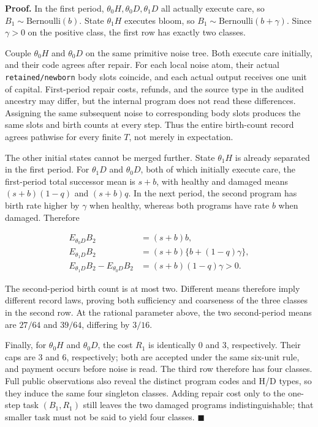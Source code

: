 \documentclass[
  english,
  11pt,
  oneside]{book}
\begin{document}
\textbf{Proof.} In the first period, \(\theta_0H,\theta_0D,\theta_1D\) all actually execute care, so \(B_1\sim\mathrm{Bernoulli}(b)\). State \(\theta_1H\) executes bloom, so \(B_1\sim\mathrm{Bernoulli}(b+\gamma)\). Since \(\gamma>0\) on the positive class, the first row has exactly two classes.

Couple \(\theta_0H\) and \(\theta_0D\) on the same primitive noise tree. Both execute care initially, and their code agrees after repair. For each local noise atom, their actual \nolinkurl{retained/newborn} body slots coincide, and each actual output receives one unit of capital. First-period repair costs, refunds, and the source type in the audited ancestry may differ, but the internal program does not read these differences. Assigning the same subsequent noise to corresponding body slots produces the same slots and birth counts at every step. Thus the entire birth-count record agrees pathwise for every finite \(T\), not merely in expectation.

The other initial states cannot be merged further. State \(\theta_1H\) is already separated in the first period. For \(\theta_1D\) and \(\theta_0D\), both of which initially execute care, the first-period total successor mean is \(s+b\), with healthy and damaged means \((s+b)(1-q)\) and \((s+b)q\). In the next period, the second program has birth rate higher by \(\gamma\) when healthy, whereas both programs have rate \(b\) when damaged. Therefore

\[\begin{aligned}
E_{\theta_0D} B_2&=(s+b)b,\\
E_{\theta_1D} B_2&=(s+b)\{b+(1-q)\gamma\},\\
E_{\theta_1D} B_2-E_{\theta_0D} B_2&=(s+b)(1-q)\gamma>0.
\end{aligned}\]

The second-period birth count is at most two. Different means therefore imply different record laws, proving both sufficiency and coarseness of the three classes in the second row. At the rational parameter above, the two second-period means are \(27/64\) and \(39/64\), differing by \(3/16\).

Finally, for \(\theta_0H\) and \(\theta_0D\), the cost \(R_1\) is identically 0 and 3, respectively. Their caps are 3 and 6, respectively; both are accepted under the same six-unit rule, and payment occurs before noise is read. The third row therefore has four classes. Full public observations also reveal the distinct program codes and H/D types, so they induce the same four singleton classes. Adding repair cost only to the one-step task \((B_1,R_1)\) still leaves the two damaged programs indistinguishable; that smaller task must not be said to yield four classes. \(\blacksquare\)
\end{document}

